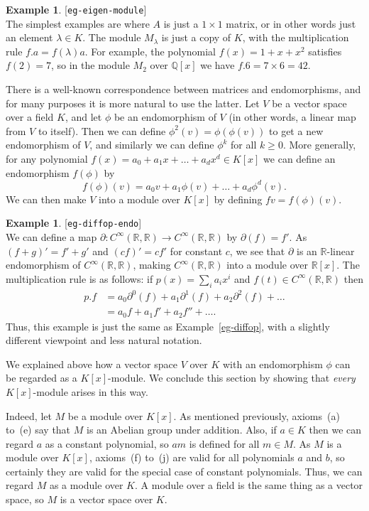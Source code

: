 \documentclass{amsart}
\newcommand{\lbl}[1]{\label{#1}\textup{[\texttt{#1}]}\ \\}
\newcommand{\lbl}{\label}
\newcommand{\Q}         {{\mathbb{Q}}}
\newcommand{\R}         {{\mathbb{R}}}
\newcommand{\lm}        {\lambda}
\newcommand{\tm}        {\times}
\newcommand{\CRR}       {C^\infty(\R,\R)}
\newcommand{\xra}       {\xrightarrow}
\renewcommand{\:}{\colon}
\theoremstyle{definition}
\newtheorem{example}[theorem]{Example}
\begin{document}
\begin{example}\lbl{eg-eigen-module}
 The simplest examples are where $A$ is just a $1\tm 1$ matrix, or in
 other words just an element $\lm\in K$.  The module $M_\lm$ is just a
 copy of $K$, with the multiplication rule $f.a=f(\lm)a$.  For
 example, the polynomial $f(x)=1+x+x^2$ satisfies $f(2)=7$, so in the
 module $M_2$ over $\Q[x]$ we have $f.6=7\tm 6=42$.
\end{example}

There is a well-known correspondence between matrices and
endomorphisms, and for many purposes it is more natural to use the
latter.  Let $V$ be a vector space over a field $K$, and let $\phi$ be
an endomorphism of $V$ (in other words, a linear map from $V$ to
itself).  Then we can define $\phi^2(v)=\phi(\phi(v))$ to get a new
endomorphism of $V$, and similarly we can define $\phi^k$ for all
$k\geq 0$.  More generally, for any polynomial
$f(x)=a_0+a_1x+\ldots+a_dx^d\in K[x]$ we can define an endomorphism
$f(\phi)$ by 
\[ f(\phi)(v) = a_0v+a_1\phi(v)+\ldots+a_d\phi^d(v). \]
We can then make $V$ into a module over $K[x]$ by defining
$fv=f(\phi)(v)$.  

\begin{example}\lbl{eg-diffop-endo}
 We can define a map $\partial\:\CRR\xra{}\CRR$ by $\partial(f)=f'$.
 As $(f+g)'=f'+g'$ and $(cf)'=cf'$ for constant $c$, we see that
 $\partial$ is an $\R$-linear endomorphism of $\CRR$, making $\CRR$
 into a module over $\R[x]$.  The multiplication rule is as follows:
 if $p(x)=\sum_ia_ix^i$ and $f(t)\in\CRR$ then
 \begin{align*}
  p.f &=
   a_0\partial^0(f) + a_1\partial^1(f) + a_2\partial^2(f) + \ldots \\
   &= a_0 f + a_1 f' + a_2 f'' + \ldots.
 \end{align*}
 Thus, this example is just the same as Example~\ref{eg-diffop}, with
 a slightly different viewpoint and less natural notation.
\end{example}

We explained above how a vector space $V$ over $K$ with an
endomorphism $\phi$ can be regarded as a $K[x]$-module.  We conclude
this section by showing that \emph{every} $K[x]$-module arises in this
way. 

Indeed, let $M$ be a module over $K[x]$.  As mentioned previously,
axioms~(a) to~(e) say that $M$ is an Abelian group under addition.
Also, if $a\in K$ then we can regard $a$ as a constant polynomial, so
$am$ is defined for all $m\in M$.  As $M$ is a module over $K[x]$,
axioms~(f) to~(j) are valid for all polynomials $a$ and $b$, so
certainly they are valid for the special case of constant
polynomials.  Thus, we can regard $M$ as a module over $K$.  A module
over a field is the same thing as a vector space, so $M$ is a vector
space over $K$.  
\end{document}

